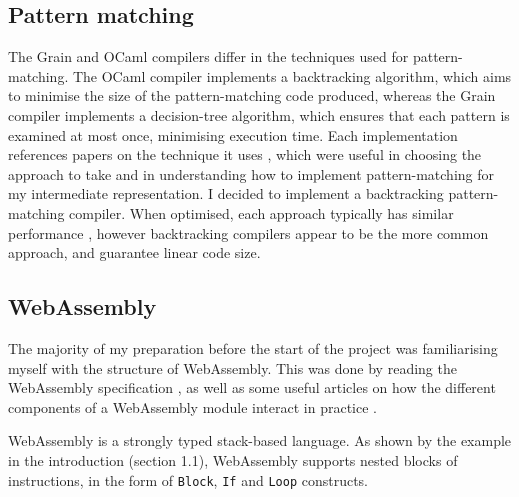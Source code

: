 
\subsection{Pattern matching}

The Grain and OCaml compilers differ in the techniques used for pattern-matching.  The OCaml compiler implements a backtracking algorithm, which aims to minimise the size of the pattern-matching code produced, whereas the Grain compiler implements a decision-tree algorithm, which ensures that each pattern is examined at most once, minimising execution time. Each implementation references papers on the technique it uses \cite{ocamlpatternmatch, decisiontrees}, which were useful in choosing the approach to take and in understanding how to implement pattern-matching for my intermediate representation.
%
I decided to implement a backtracking pattern-matching compiler.  When optimised, each approach typically has similar performance \cite{decisiontrees}, however backtracking compilers appear to be the more common approach, and guarantee linear code size.


\subsection{WebAssembly}
The majority of my preparation before the start of the project was familiarising myself with the structure of WebAssembly.
This was done by reading the WebAssembly specification \cite{wasm}, as well as some useful articles on how the different components of a WebAssembly module interact in practice \cite{wasm-article}.

WebAssembly is a strongly typed stack-based language. %
As shown by the example in the introduction (section 1.1), WebAssembly supports nested blocks of instructions, in the form of \verb|Block|, \verb|If| and \verb|Loop| constructs. 


